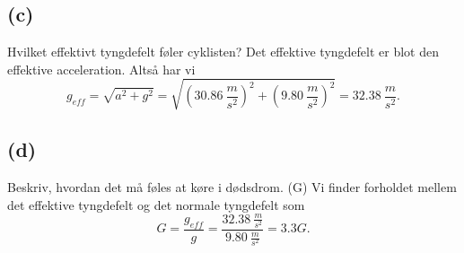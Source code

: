 \documentclass[12pt]{article}
\theoremstyle{definition}
\begin{document}
\subsection*{(c)}
Hvilket effektivt tyngdefelt føler cyklisten?
\bigbreak
Det effektive tyngdefelt er blot den effektive acceleration. Altså har vi
\[ 
g_{eff} = \sqrt{a^2 + g^2} = \sqrt{\left( \qty{30,86}{\frac{m}{s^2}}  \right)^2 + \left( \qty{9,80}{\frac{m}{s^2}} \right)^2} = \qty{32,38}{\frac{m}{s^2}}  
.\]


\subsection*{(d)}
Beskriv, hvordan det må føles at køre i dødsdrom. (G)
\bigbreak
Vi finder forholdet mellem det effektive tyngdefelt og det normale tyngdefelt som
\[ 
G = \frac{g_{eff}}{g} = \frac{\qty{32,38}{\frac{m}{s^2}}}{\qty{9,80}{\frac{m}{s^2}}} = \num{3,3}G
.\]
\end{document}

